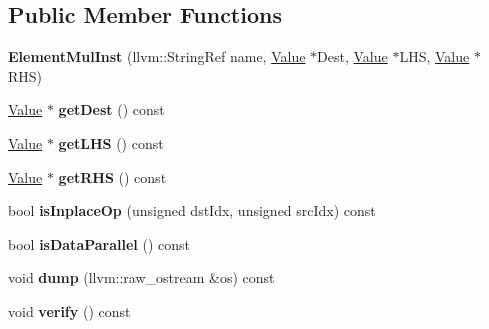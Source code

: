 \subsection*{Public Member Functions}
\begin{DoxyCompactItemize}
\item 
\mbox{\label{classglow_1_1_element_mul_inst_a73f6454e806627ae98151d24b531e955}} 
{\bfseries Element\+Mul\+Inst} (llvm\+::\+String\+Ref name, \hyperlink{classglow_1_1_value}{Value} $\ast$Dest, \hyperlink{classglow_1_1_value}{Value} $\ast$L\+HS, \hyperlink{classglow_1_1_value}{Value} $\ast$R\+HS)
\item 
\mbox{\label{classglow_1_1_element_mul_inst_a02f18a35bf874ed34670fab1db34d8cc}} 
\hyperlink{classglow_1_1_value}{Value} $\ast$ {\bfseries get\+Dest} () const
\item 
\mbox{\label{classglow_1_1_element_mul_inst_a2f9bc80a2c2a2398c1520e8e921f8ef2}} 
\hyperlink{classglow_1_1_value}{Value} $\ast$ {\bfseries get\+L\+HS} () const
\item 
\mbox{\label{classglow_1_1_element_mul_inst_a15a7e248812dfc1c6a9fdecb025b1b94}} 
\hyperlink{classglow_1_1_value}{Value} $\ast$ {\bfseries get\+R\+HS} () const
\item 
\mbox{\label{classglow_1_1_element_mul_inst_abde6ae09a0a69cea2a1168907b5ae641}} 
bool {\bfseries is\+Inplace\+Op} (unsigned dst\+Idx, unsigned src\+Idx) const
\item 
\mbox{\label{classglow_1_1_element_mul_inst_a8ed5938e4c10223e11cab249f8e6dc89}} 
bool {\bfseries is\+Data\+Parallel} () const
\item 
\mbox{\label{classglow_1_1_element_mul_inst_a0ec98a7a37721299e56679079c23494b}} 
void {\bfseries dump} (llvm\+::raw\+\_\+ostream \&os) const
\item 
\mbox{\label{classglow_1_1_element_mul_inst_ad2e17cf45449bff0e7c3f73f55739cac}} 
void {\bfseries verify} () const
\end{DoxyCompactItemize}
